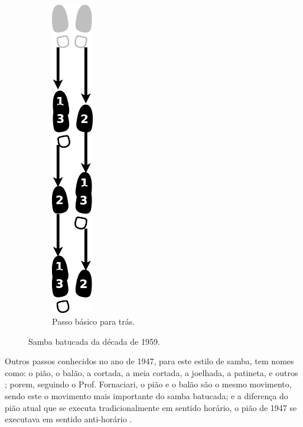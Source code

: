 \begin{itemize}
\begin{figure}[h]
\begin{subfigure}[b]{0.3\textwidth}
    \end{subfigure}
    ~ %
    \begin{subfigure}[b]{0.3\textwidth}
        \centering
	\includegraphics[width=0.2\textwidth]{chapters/cap-historia-sambagafieira/samba-batucada-basico-tras.eps}
        \caption{Passo básico para trás.}
        \label{fig:samba-batucada-basico-tras}
    \end{subfigure}
    \caption{Samba batucada da década de 1959.}\label{fig:samba-batucada-basico}
\end{figure}

Outros passos conhecidos no ano de 1947, para este estilo de samba, tem nomes como: 
o pião, o balão, a cortada, a meia cortada, a joelhada, a patineta, e outros \cite[pp. 66]{fornaciari1947aprender};
porem, seguindo o Prof. Fornaciari, o pião e o balão são o mesmo movimento, 
sendo este o movimento mais importante do samba batucada;
e a diferença do pião atual que se executa tradicionalmente em sentido horário,
o pião de 1947 se executava em sentido anti-horário \cite[pp. 68,72]{fornaciari1947aprender}.





\end{itemize}

